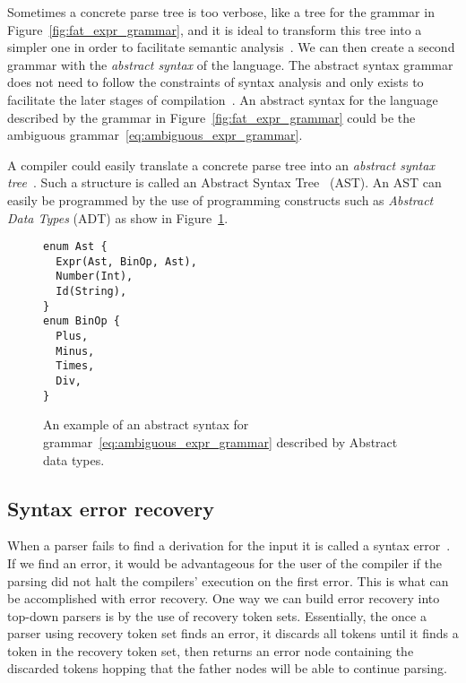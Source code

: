 \documentclass[
  oneside,
  english,
  coorientadorbanca,
  embeddedlogo,
  noabntexcite
]{ufsc-thesis-rn46-2019}
\begin{document}
Sometimes a concrete parse tree is too verbose, like a tree for the grammar in Figure~\ref{fig:fat_expr_grammar}, and it is ideal to transform this tree into a simpler one in order to facilitate semantic analysis~\cite{appel2003modern}.
We can then create a second grammar with the \textit{abstract syntax} of the language.
The abstract syntax grammar does not need to follow the constraints of syntax analysis and only exists to facilitate the later stages of compilation~\cite{appel2003modern}.
An abstract syntax for the language described by the grammar in Figure~\ref{fig:fat_expr_grammar} could be the ambiguous grammar~\eqref{eq:ambiguous_expr_grammar}.

A compiler could easily translate a concrete parse tree into an \textit{abstract syntax tree}~\cite{appel2003modern}.
Such a structure is called an Abstract Syntax Tree~\cite{appel2003modern} (AST).
An AST can easily be programmed by the use of programming constructs such as \textit{Abstract Data Types} (ADT) as show in Figure~\ref{fig:abstract_syntax_adt}.

\begin{figure}[ht]
  \centering
  \begin{minipage}{0.6\textwidth}
    \begin{verbatim}
enum Ast {
  Expr(Ast, BinOp, Ast),
  Number(Int),
  Id(String),
}
enum BinOp {
  Plus,
  Minus,
  Times,
  Div,
}
    \end{verbatim}
  \end{minipage}
  \caption{
    An example of an abstract syntax for grammar~\eqref{eq:ambiguous_expr_grammar} described by Abstract data types.
  }\label{fig:abstract_syntax_adt}
\end{figure}

\subsection{Syntax error recovery}

When a parser fails to find a derivation for the input it is called a syntax error~\cite{appel2003modern}.
If we find an error, it would be advantageous for the user of the compiler if the parsing did not halt the compilers' execution on the first error.
This is what can be accomplished with error recovery.
One way we can build error recovery into top-down parsers is by the use of recovery token sets.
Essentially, the once a parser using recovery token set finds an error, it discards all tokens until it finds a token in the recovery token set, then returns an error node containing the discarded tokens hopping that the father nodes will be able to continue parsing.
\end{document}
